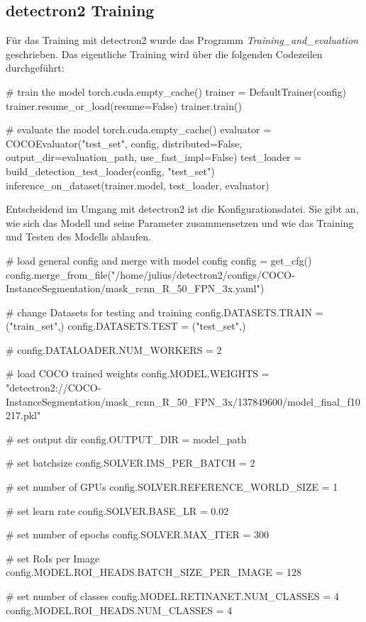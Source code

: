 \documentclass[a4paper,12pt,ngerman]{article}
\begin{document}
\subsection{detectron2 Training}

Für das Training mit detectron2 wurde das Programm \textit{Training\_and\_evaluation} geschrieben. Das eigentliche Training wird über die folgenden Codezeilen durchgeführt: \\

\begin{python}
	# train the model
    torch.cuda.empty_cache()
    trainer = DefaultTrainer(config)
    trainer.resume_or_load(resume=False)
    trainer.train()

    # evaluate the model
    torch.cuda.empty_cache()
    evaluator = COCOEvaluator("test_set", config, distributed=False, output_dir=evaluation_path, use_fast_impl=False)
    test_loader = build_detection_test_loader(config, "test_set")
    inference_on_dataset(trainer.model, test_loader, evaluator)
\end{python}

Entscheidend im Umgang mit detectron2 ist die Konfigurationsdatei. Sie gibt an, wie sich das Modell und seine Parameter zusammensetzen und wie das Training und Testen des Modells ablaufen. \\

\begin{python}
	# load general config and merge with model config
    config = get_cfg()
    config.merge_from_file("/home/julius/detectron2/configs/COCO-InstanceSegmentation/mask_rcnn_R_50_FPN_3x.yaml")
    
    # change Datasets for testing and training
    config.DATASETS.TRAIN = ("train_set",)
    config.DATASETS.TEST = ("test_set",)
    
    # config.DATALOADER.NUM_WORKERS = 2
    
    # load COCO trained weights 
    config.MODEL.WEIGHTS = "detectron2://COCO-InstanceSegmentation/mask_rcnn_R_50_FPN_3x/137849600/model_final_f10217.pkl"
    
    # set output dir
    config.OUTPUT_DIR = model_path

    # set batchsize
    config.SOLVER.IMS_PER_BATCH = 2
    
    # set number of GPUs
    config.SOLVER.REFERENCE_WORLD_SIZE = 1

    # set learn rate
    config.SOLVER.BASE_LR = 0.02

    # set number of epochs
    config.SOLVER.MAX_ITER = 300

    # set RoIs per Image
    config.MODEL.ROI_HEADS.BATCH_SIZE_PER_IMAGE = 128

    # set number of classes
    config.MODEL.RETINANET.NUM_CLASSES = 4
    config.MODEL.ROI_HEADS.NUM_CLASSES = 4
\end{python}
\end{document}
